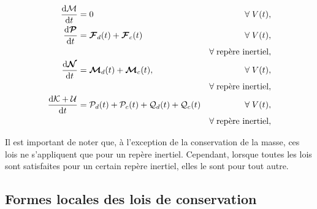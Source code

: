 \documentclass[a4paper,11pt]{report}
\begin{document}
      \begin{align}
        \dv{\mathcal{M}}{t} &= 0 & \forall \; V(t),\nonumber\\
        \dv{\boldsymbol{\mathcal{P}}}{t}(t) &= \boldsymbol{\mathcal{F}}_d(t) + \boldsymbol{\mathcal{F}}_c(t) & \forall \; V(t), \nonumber\\
        & & \forall \; \textrm{repère inertiel},\nonumber\\
        \dv{\boldsymbol{\mathcal{N}}}{t}(t) &= \boldsymbol{\mathcal{M}}_d(t) + \boldsymbol{\mathcal{M}}_c(t), & \forall \; V(t), \label{eq:conservationGlobale}\\
        & & \forall \; \textrm{repère inertiel}, \nonumber\\
        \dv{\mathcal{K} + \mathcal{U}}{t}(t) &= \mathcal{P}_d(t) + \mathcal{P}_c(t) + \mathcal{Q}_d(t) + \mathcal{Q}_c(t) & \forall \; V(t), \nonumber\\
        & & \forall \; \textrm{repère inertiel}, \nonumber
      \end{align}

      Il est important de noter que, à l'exception de la conservation de la masse, ces lois ne s'appliquent que pour un repère inertiel. Cependant, lorsque toutes les lois sont satisfaites pour un certain repère inertiel, elles le sont pour tout autre.

    \subsection{Formes locales des lois de conservation}
      
\end{document}
